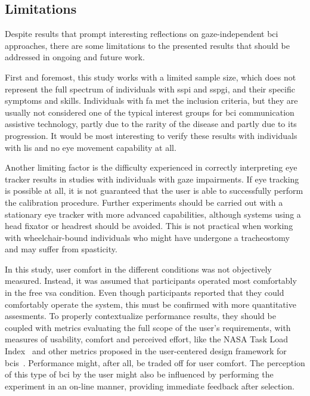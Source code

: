\documentclass[twocolumn]{article}
\begin{document}
\subsection{Limitations}

Despite results that prompt interesting reflections on gaze-independent \ac{bci}
approaches, there are some limitations to the presented results that should be
addressed in ongoing and future work.

First and foremost, this study works with a limited sample size, which
does not represent the full spectrum of individuals with \ac{sspi} and
\ac{sspgi}, and their specific symptoms and skills.
Individuals with \ac{fa} met the inclusion criteria, but they are usually not
considered one of the typical interest groups for \ac{bci} communication assistive
technology, partly due to the rarity of the disease and partly due to its
progression.
It would be most interesting to verify these results with individuals with
\ac{lis} and no eye movement capability at all.

Another limiting factor is the difficulty experienced in correctly interpreting eye
tracker results in studies with individuals with gaze impairments.
If eye tracking is possible at all, it is not guaranteed that the user is able
to successfully perform the calibration procedure.
Further experiments should be carried out with a stationary eye tracker with
more advanced capabilities, although systems using a head fixator or headrest
should be avoided.
This is not practical when working with
wheelchair-bound individuals who might have undergone a tracheostomy and may
suffer from spasticity.

In this study, user comfort in the different conditions was not objectively
measured.
Instead, it was assumed that participants operated most comfortably in the free
\ac{vsa} condition.
Even though participants reported that they could comfortably operate the
system, this must be confirmed with more quantitative assesments.
To properly contextualize performance results, they should be coupled with
metrics evaluating the full scope of the user's requirements, with measures of
usability, comfort and perceived effort, like the NASA Task Load
Index~\cite{Hart2006} and other metrics proposed in the user-centered design
framework for \acp{bci}~\cite{Kuebler2014}.
Performance might, after all, be traded off for user comfort.
The perception of this type of \ac{bci} by the user might also be influenced by
performing the experiment in an on-line manner, providing immediate feedback
after selection.
\end{document}
